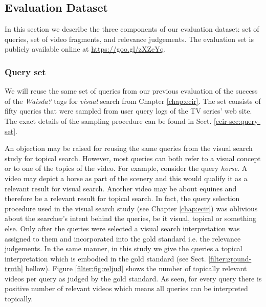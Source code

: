 \subsection{Evaluation Dataset}\label{sec:topicir-filter:eval-ds}
In this section we describe the three components of our evaluation dataset: set of queries, set of video fragments, and relevance judgements. The evaluation set is publicly available online at \url{https://goo.gl/zXZeYq}.
\subsubsection{Query set}
We will reuse the same set of queries from our previous evaluation of the success of the \textit{Waisda?} tags for \textit{visual} search from Chapter \ref{chap:ecir}. The set consists of fifty queries that were sampled from user query logs of the TV series' web site. The exact details of the sampling procedure can be found in Sect. \ref{ecir-sec:query-set}.


An objection may be raised for reusing the same queries from the visual search study for topical search. However, most queries can both refer to a visual concept or to one of the topics of the video. For example, consider the query \textit{horse}. A video may depict a horse as part of the scenery and this would qualify it as a relevant result for visual search.  Another video may be about equines and therefore be a relevant result for topical search.
In fact, the query selection procedure used in the visual search study (see Chapter \ref{chap:ecir}) was oblivious about the searcher's intent behind the queries, be it visual, topical or something else. Only after the queries were selected a visual search interpretation was assigned to them and incorporated into the gold standard i.e. the relevance judgements. In the same manner, in this study we give the queries a topical interpretation which is embodied in the gold standard (see Sect. \ref{filter:ground-truth} bellow). Figure \ref{filter:fig:reljud} shows the number of topically relevant videos per query as judged by the gold standard. As seen, for every query there is positive number of relevant videos which means all queries can be interpreted topically.

